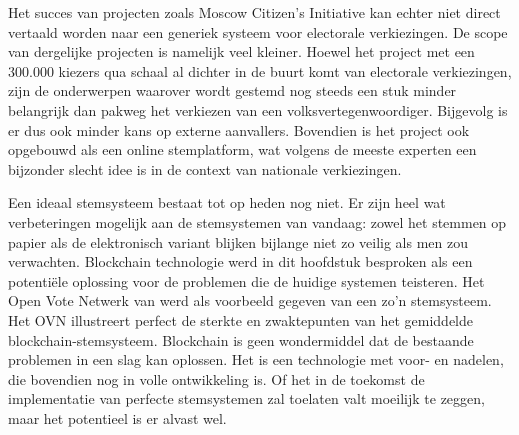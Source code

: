 	Het succes van projecten zoals Moscow Citizen's Initiative kan echter niet direct vertaald worden naar een generiek systeem voor electorale verkiezingen. De scope van dergelijke projecten is namelijk veel kleiner. Hoewel het project met een 300.000 kiezers qua schaal al dichter in de buurt komt van electorale verkiezingen, zijn de onderwerpen waarover wordt gestemd nog steeds een stuk minder belangrijk dan pakweg het verkiezen van een volksvertegenwoordiger. Bijgevolg is er dus ook minder kans op externe aanvallers. Bovendien is het project ook opgebouwd als een online stemplatform, wat volgens de meeste experten een bijzonder slecht idee is in de context van nationale verkiezingen.
	
	Een ideaal stemsysteem bestaat tot op heden nog niet. Er zijn heel wat verbeteringen mogelijk aan de stemsystemen van vandaag: zowel het stemmen op papier als de elektronisch variant blijken bijlange niet zo veilig als men zou verwachten. Blockchain technologie werd in dit hoofdstuk besproken als een potentiële oplossing voor de problemen die de huidige systemen teisteren. Het Open Vote Netwerk van \textcite{McCorry2017} werd als voorbeeld gegeven van een zo'n stemsysteem. Het OVN illustreert perfect de sterkte en zwaktepunten van het gemiddelde blockchain-stemsysteem. Blockchain is geen wondermiddel dat de bestaande problemen in een slag kan oplossen. Het is een technologie met  voor- en nadelen, die bovendien nog in volle ontwikkeling is. Of het in de toekomst de implementatie van perfecte stemsystemen zal toelaten valt moeilijk te zeggen, maar het potentieel is er alvast wel. 
	
	

	
	
	
		
		
		
		
		
		
	